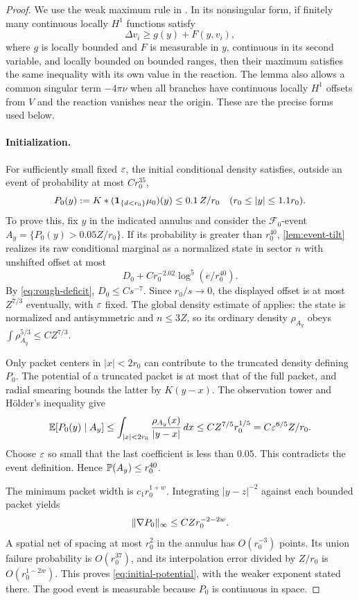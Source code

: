 \begin{proof}
We use the weak maximum rule in \cite[\FMaximum]{Foundation}.
In its nonsingular form, if finitely many continuous locally $H^1$
functions satisfy
\[
 \Delta v_i\ge g(y)+F(y,v_i),
\]
where $g$ is locally bounded and $F$ is measurable in $y$, continuous
in its second variable, and locally bounded on bounded ranges, then
their maximum satisfies the same inequality with its own value in
the reaction.  The lemma also allows a common singular term
$-4\pi\nu$ when all branches have continuous locally $H^1$ offsets
from $V$ and the reaction vanishes near the origin.  These are the
precise forms used below.

\paragraph{Initialization.}
For sufficiently small fixed $\varepsilon$, the initial conditional density
satisfies, outside an event of probability at most $Cr_0^{35}$,
\begin{equation}\label{eq:initial-potential}
 P_0(y):=K*(\mathbf 1_{\{d<r_0\}}\mu_0)(y)
       \le0.1\,Z/r_0
       \quad(r_0\le |y|\le1.1r_0).
\end{equation}
To prove this, fix $y$ in the indicated annulus and consider the
$\mathcal F_0$-event $A_y=\{P_0(y)>0.05Z/r_0\}$.  If its probability
is greater than $r_0^{40}$, \cref{lem:event-tilt} realizes its raw
conditional marginal as a normalized state in sector $n$ with
unshifted offset at most
\[
 D_0+Cr_0^{-2.02}\log^5(e/r_0^{40}).
\]
By \cref{eq:rough-deficit}, $D_0\le Cs^{-7}$.  Since $r_0/s\to0$,
the displayed offset is at most $Z^{7/3}$ eventually, with $\varepsilon$
fixed.  The global density estimate of
\cite[\FGlobalDensity]{Foundation} applies: the state is normalized and
antisymmetric and $n\le3Z$, so its ordinary density $\rho_{A_y}$
obeys $\int\rho_{A_y}^{5/3}\le CZ^{7/3}$.

Only packet centers in $|x|<2r_0$ can contribute to the truncated
density defining $P_0$.  The potential of a truncated packet is at
most that of the full packet, and radial smearing bounds the latter
by $K(y-x)$.  The observation tower and H\"older's inequality give
\[
 \mathbb E[P_0(y)\mid A_y]
 \le\int_{|x|<2r_0}\frac{\rho_{A_y}(x)}{|y-x|}\,dx
 \le CZ^{7/5}r_0^{1/5}
 =C\varepsilon^{6/5}Z/r_0.
\]
Choose $\varepsilon$ so small that the last coefficient is less than $0.05$.
This contradicts the event definition.  Hence
$\mathbb P(A_y)\le r_0^{40}$.

The minimum packet width is $c_1r_0^{1+w}$.  Integrating
$|y-z|^{-2}$ against each bounded packet yields
\[
 \lVert\nabla P_0\rVert_\infty\le CZr_0^{-2-2w}.
\]
A spatial net of spacing at most $r_0^2$ in the annulus has
$O(r_0^{-3})$ points.  Its union failure probability is
$O(r_0^{37})$, and its interpolation error divided by $Z/r_0$ is
$O(r_0^{1-2w})$.  This proves \cref{eq:initial-potential}, with the
weaker exponent stated there.  The good event is measurable because
$P_0$ is continuous in space.


\end{proof}
